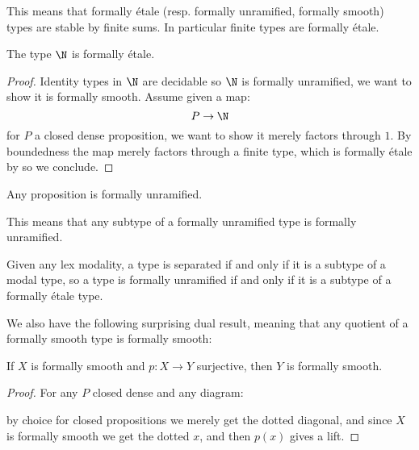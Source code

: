 \begin{remark}\label{finite-are-etale}
This means that formally étale (resp. formally unramified, formally smooth) types are stable by finite sums. In particular finite types are formally étale.
\end{remark}

\begin{proposition}
The type $\N$ is formally étale.
\end{proposition}

\begin{proof}
Identity types in $\N$ are decidable so $\N$ is formally unramified, we want to show it is formally smooth. Assume given a map:
\[P\to \N\]
for $P$ a closed dense proposition, we want to show it merely factors through $1$. By boundedness the map merely factors through a finite type, which is formally étale by  so we conclude.
\end{proof}

\begin{lemma}\label{prop-are-unramified}
Any proposition is formally unramified.
\end{lemma}

This means that any subtype of a formally unramified type is formally unramified.

\begin{remark}
  Given any lex modality, a type is separated if and only if it is a subtype of a modal type,
  so a type is formally unramified if and only if it is a subtype of a formally étale type.
\end{remark}

We also have the following surprising dual result, meaning that any quotient of a formally smooth type is formally smooth:

\begin{proposition}\label{smoothSurjective}
If $X$ is formally smooth and $p:X\to Y$ surjective, then $Y$ is formally smooth.
\end{proposition}

\begin{proof}
For any $P$ closed dense and any diagram:
 \begin{center}
    \end{center} 
    by choice for closed propositions we merely get the dotted diagonal, and since $X$ is formally smooth we get the dotted $x$, and then $p(x)$ gives a lift.
\end{proof}


